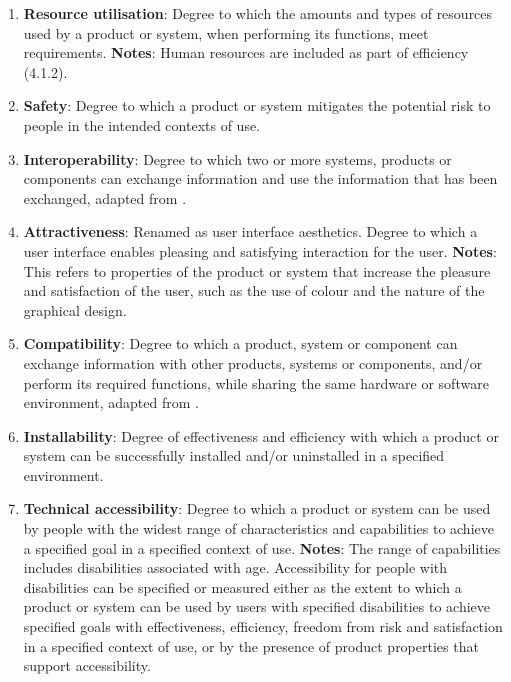 \begin{enumerate}
    \item \textbf{Resource utilisation}: Degree to which the amounts and types of resources used by a product or system, when performing its functions, meet requirements. \textbf{Notes}: Human resources are included as part of efficiency (4.1.2).

    \item \textbf{Safety}: Degree to which a product or system mitigates the potential risk to people in the intended contexts of use.

    \item \textbf{Interoperability}: Degree to which two or more systems, products or components can exchange information and use the information that has been exchanged, adapted from \cite{iso_central_secretary_isoiecieee_2010}.

    \item \textbf{Attractiveness}: Renamed as user interface aesthetics. Degree to which a user interface enables pleasing and satisfying interaction for the user. \textbf{Notes}: This refers to properties of the product or system that increase the pleasure and satisfaction of the user, such as the use of colour and the nature of the graphical design.

    \item \textbf{Compatibility}: Degree to which a product, system or component can exchange information with other products, systems or components, and/or perform its required functions, while sharing the same hardware or software environment, adapted from \cite{iso_central_secretary_isoiecieee_2010}.

    \item \textbf{Installability}: Degree of effectiveness and efficiency with which a product or system can be successfully installed and/or uninstalled in a specified environment.

    \item \textbf{Technical accessibility}: Degree to which a product or system can be used by people with the widest range of characteristics and capabilities to achieve a specified goal in a specified context of use. \textbf{Notes}: The range of capabilities includes disabilities associated with age. Accessibility for people with disabilities can be specified or measured either as the extent to which a product or system can be used by users with specified disabilities to achieve specified goals with effectiveness, efficiency, freedom from risk and satisfaction in a specified context of use, or by the presence of product properties that support accessibility.


\end{enumerate}
